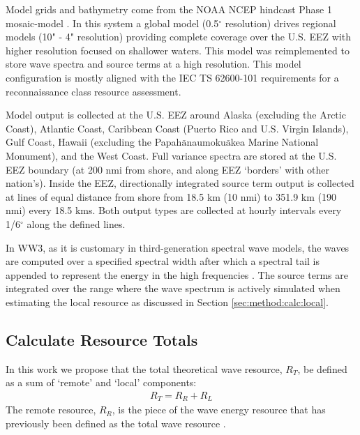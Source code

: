 Model grids and bathymetry come from the NOAA NCEP hindcast Phase 1 mosaic-model \citep{chawla2011wavewatch,chawla201230}. In this system a global model (0.5$^{\circ}$ resolution) drives regional models (10" - 4" resolution) providing complete coverage over the U.S. EEZ with higher resolution focused on shallower waters. This model was reimplemented to store wave spectra and source terms at a high resolution. This model configuration is mostly aligned with the IEC TS 62600-101 requirements for a reconnaissance class resource assessment.

Model output is collected at the U.S. EEZ around Alaska (excluding the Arctic Coast), Atlantic Coast, Caribbean Coast (Puerto Rico and U.S. Virgin Islands), Gulf Coast, Hawaii (excluding the Papah$\bar{\text{a}}$naumoku$\bar{\text{a}}$kea Marine National Monument), and the West Coast. Full variance spectra are stored at the U.S. EEZ boundary (at 200 nmi from shore, and along EEZ `borders' with other nation's). Inside the EEZ, directionally integrated source term output is collected at lines of equal distance from shore from 18.5 km (10 nmi) to 351.9 km (190 nmi) every 18.5 kms. Both output types are collected at hourly intervals every 1/6$^{\circ}$ along the defined lines.

In WW3, as it is customary in third-generation spectral wave models, the waves are computed over a specified spectral width after which a spectral tail is appended to represent the energy in the high frequencies \citep[e.g.][]{ardhuinObservationSwellDissipation2009}. The source terms are integrated over the range where the wave spectrum is actively simulated when estimating the local resource as discussed in Section \ref{sec:method:calc:local}.

\subsection{Calculate Resource Totals} \label{sec:method:calc}

In this work we propose that the total theoretical wave resource, $R_T$, be defined as a sum of `remote' and `local' components:
\begin{align}
  R_T = R_R + R_L
\end{align}
The remote resource, $R_R$, is the piece of the wave energy resource that has previously been defined as the total wave resource \citep{gunnQuantifyingGlobalWave2012,EPRIwaveresource2011}.%


